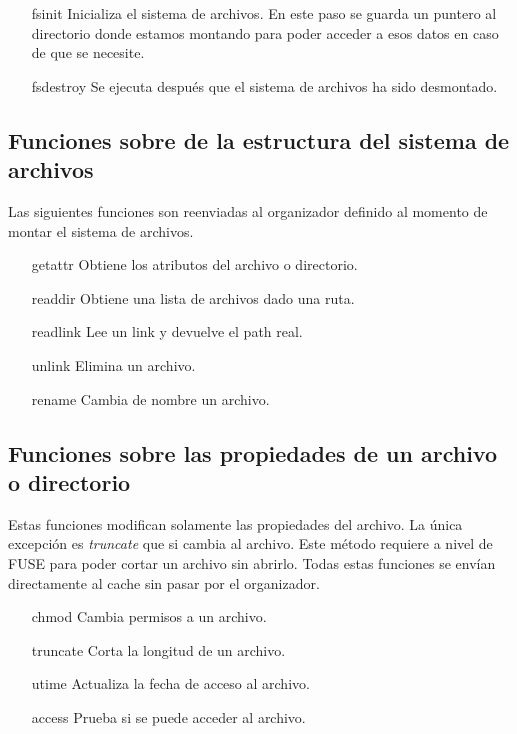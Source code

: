 \begin{itemize}
\item[fsinit] Inicializa el sistema de archivos. En este paso se guarda un puntero al directorio donde estamos montando para poder acceder a esos datos en caso de que se necesite.
\item[fsdestroy] Se ejecuta después que el sistema de archivos ha sido desmontado.
\end{itemize}

\subsection{Funciones sobre de la estructura del sistema de archivos}

Las siguientes funciones son reenviadas al organizador definido al momento de montar el sistema de archivos.

\begin{itemize}
\item[getattr] Obtiene los atributos del archivo o directorio.
\item[readdir] Obtiene una lista de archivos dado una ruta.
\item[readlink] Lee un link	y devuelve el path real.
\item[unlink] Elimina un archivo.
\item[rename] Cambia de nombre un archivo.
\end{itemize}

\subsection{Funciones sobre las propiedades de un archivo o directorio}

Estas funciones modifican solamente las propiedades del archivo. La única excepción es  \textit{truncate} que si cambia al archivo. Este método requiere a nivel de FUSE para poder cortar un archivo sin abrirlo. Todas estas funciones se envían directamente al cache sin pasar por el organizador.

\begin{itemize}
\item[chmod] Cambia permisos a un archivo.
\item[truncate] Corta la longitud de un archivo.
\item[utime] Actualiza la fecha de acceso al archivo.
\item[access] Prueba si se puede acceder al archivo.
\end{itemize}

